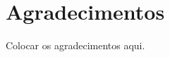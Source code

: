 


% 
% 
% 

\begingroup
\let\clearpage\relax
\let\cleardoublepage\relax
\let\cleardoublepage\relax
\chapter*{Agradecimentos}
Colocar os  agradecimentos aqui.



\endgroup


